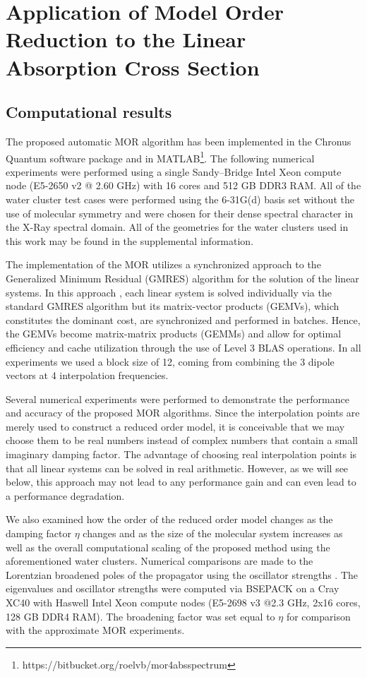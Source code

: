\section{Application of Model Order Reduction to the Linear Absorption 
  Cross Section}

\subsection{Computational results}
\label{sec:MORresults}

The proposed automatic MOR algorithm has been implemented in the Chronus
Quantum software package\cite{chronusq_beta} and in
MATLAB\footnote[4]{https://bitbucket.org/roelvb/mor4absspectrum}.
The following numerical experiments were performed using a single
Sandy--Bridge Intel Xeon compute node (E5-2650 v2 @ 2.60 GHz) with 16
cores and 512 GB DDR3 RAM. All of the water cluster test cases were performed
using the 6-31G(d) basis set without the use of molecular symmetry and
were chosen for their dense spectral character in the X-Ray spectral domain.
All of the geometries for the water clusters used in this work may be
found in the supplemental information.

The implementation of the MOR utilizes a synchronized approach to the
Generalized Minimum Residual (GMRES)\cite{Walker88_152} algorithm for the
solution of the linear systems. In this approach \cite{shak2016}, each linear
system is solved individually via the standard GMRES algorithm but its
matrix-vector products (GEMVs), which constitutes the dominant cost, are synchronized
and performed in batches. Hence, the GEMVs become matrix-matrix
products (GEMMs) and allow for optimal efficiency and cache utilization through
the use of Level 3 BLAS operations. In all experiments we used a block size of
12, coming from combining the 3 dipole vectors at 4 interpolation frequencies.

Several numerical experiments were performed to demonstrate the performance and accuracy of the proposed MOR algorithms. Since the interpolation points are merely used to construct a reduced order model, it is conceivable that we may choose them to be real numbers instead of complex numbers that contain a small imaginary damping factor.  The advantage of choosing real interpolation points is that all linear systems can be solved in real arithmetic. However, as we will see below, this approach may not lead to any performance gain and can even lead to a performance degradation.

We also examined how the order of the reduced order model changes as the damping factor $\eta$ changes and as the size of the molecular system increases as well as the overall computational scaling of the proposed method using the aforementioned water clusters. Numerical comparisons are made to the Lorentzian broadened poles of the propagator using the oscillator strengths \cite{Ball64_844,Harris69_3947,McKoy75_1168}. The eigenvalues and oscillator strengths were computed via BSEPACK\cite{bsepack,SJYDL2016} on a Cray XC40 with Haswell Intel Xeon compute nodes (E5-2698 v3 @2.3 GHz, 2x16 cores, 128 GB DDR4 RAM). The broadening factor was set equal to $\eta$ for comparison with the approximate MOR experiments.

